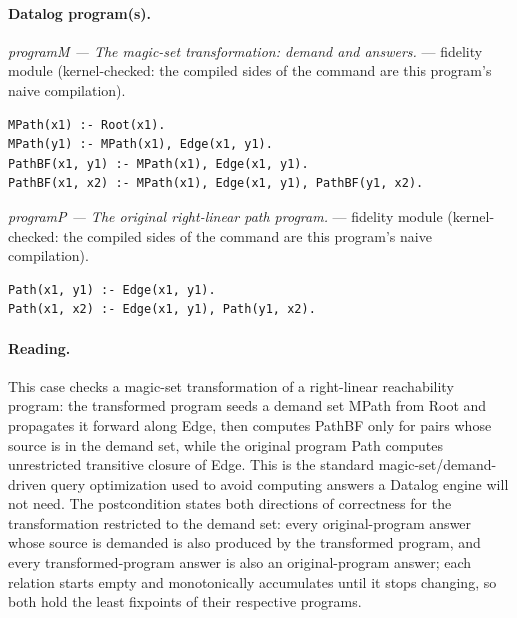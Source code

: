 \documentclass[10pt]{article}
\begin{document}
\paragraph{Datalog program(s).}

{\raggedright\textit{programM --- The magic-set transformation: demand and answers.} --- fidelity module (kernel-checked: the compiled sides of the command are this program's naive compilation).\par}

\begin{Verbatim}[fontsize=\scriptsize,breaklines=true,breakanywhere=true,frame=single,framesep=1.5mm]
MPath(x1) :- Root(x1).
MPath(y1) :- MPath(x1), Edge(x1, y1).
PathBF(x1, y1) :- MPath(x1), Edge(x1, y1).
PathBF(x1, x2) :- MPath(x1), Edge(x1, y1), PathBF(y1, x2).
\end{Verbatim}

{\raggedright\textit{programP --- The original right-linear path program.} --- fidelity module (kernel-checked: the compiled sides of the command are this program's naive compilation).\par}

\begin{Verbatim}[fontsize=\scriptsize,breaklines=true,breakanywhere=true,frame=single,framesep=1.5mm]
Path(x1, y1) :- Edge(x1, y1).
Path(x1, x2) :- Edge(x1, y1), Path(y1, x2).
\end{Verbatim}

\paragraph{Reading.} This case checks a magic-set transformation of a right-linear reachability program: the transformed program seeds a demand set MPath from Root and propagates it forward along Edge, then computes PathBF only for pairs whose source is in the demand set, while the original program Path computes unrestricted transitive closure of Edge. This is the standard magic-set/demand-driven query optimization used to avoid computing answers a Datalog engine will not need. The postcondition states both directions of correctness for the transformation restricted to the demand set: every original-program answer whose source is demanded is also produced by the transformed program, and every transformed-program answer is also an original-program answer; each relation starts empty and monotonically accumulates until it stops changing, so both hold the least fixpoints of their respective programs.
\end{document}
